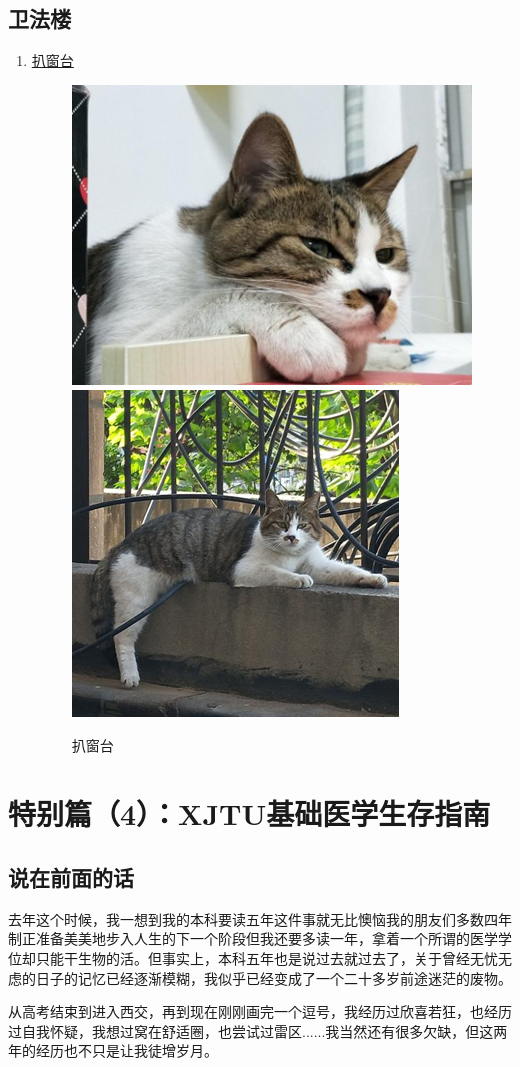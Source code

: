 \documentclass[zihao=-4,fontset=none]{Beautybook-CN}
\begin{document}
\section{卫法楼}
\begin{enumerate}
    \item \hyperref[img5960]{扒窗台}
    \begin{figure}[htbp]
            \centering
            \includegraphics[width=0.4\linewidth]{media/cimage59.png}
        \qquad
            \includegraphics[width=0.4\linewidth]{media/cimage60.png}
            \caption{扒窗台}
            \label{img5960}
    \end{figure}
    \end{enumerate}
    
\chapter{特别篇（4）：XJTU基础医学生存指南}

\section{说在前面的话}

去年这个时候，我一想到我的本科要读五年这件事就无比懊恼\textemdash{}\textemdash{}我的朋友们多数四年制正准备美美地步入人生的下一个阶段但我还要多读一年，拿着一个所谓的医学学位却只能干生物的活。但事实上，本科五年也是说过去就过去了，关于曾经无忧无虑的日子的记忆已经逐渐模糊，我似乎已经变成了一个二十多岁前途迷茫的废物。

从高考结束到进入西交，再到现在刚刚画完一个逗号，我经历过欣喜若狂，也经历过自我怀疑，我想过窝在舒适圈，也尝试过雷区......我当然还有很多欠缺，但这两年的经历也不只是让我徒增岁月。
\end{document}
